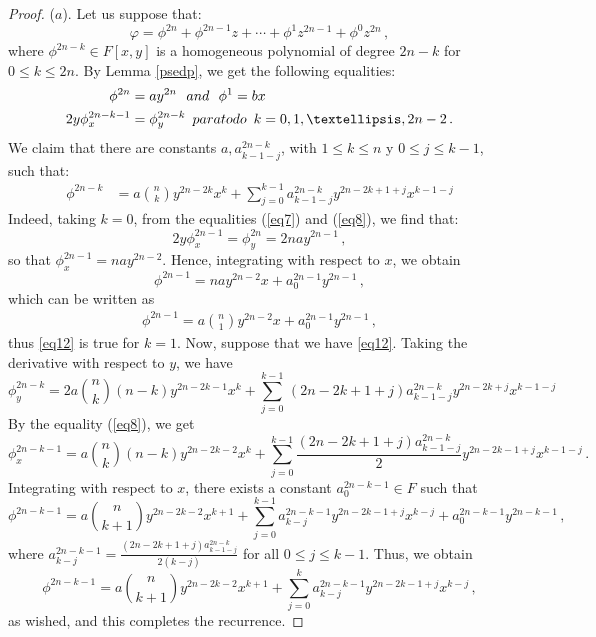 \documentclass{amsart}
\begin{document}
\begin{proof}
	($a$). Let us suppose that:
	\begin{equation}\label{eqh}
		\varphi=\phi^{2n}+\phi^{2n-1}z+\cdots+\phi^{1}z^{2n-1}+\phi^0z^{2n}\,,
	\end{equation}
	where $\phi^{2n-k}\in F[x,y]$ is a homogeneous polynomial of degree $2n-k$ for  $0\leq k\leq 2n$. By Lemma \ref{psedp}, we get the following equalities: 
	\begin{align}	
		\phi^{2n}&=ay^{2n}\label{eq7}\,\,\,\, \textnormal{and}\,\,\,\, \phi^{1}=bx\\
		2y\phi^{2n-k-1}_x&=\phi^{2n-k}_y\,\,\, \textnormal{para todo}\,\,\, k=0,1,\dots, 2n-2\,.\label{eq8}
	\end{align}
	We claim that there are constants $a, a^{2n-k}_{k-1-j}$, with  $1\leq k\leq n$ y $0\leq j\leq k-1$, such that:
	\begin{align}
		\phi^{2n-k}&=a\binom{n}{k}y^{2n-2k}x^k+\sum_{j=0}^{k-1} a^{2n-k}_{k-1-j}y^{2n-2k+1+j}x^{k-1-j}\label{eq12}
	\end{align}
	Indeed, taking $k=0$, from the equalities (\ref{eq7}) and  (\ref{eq8}), we find that:
	\begin{equation*}
		2y\phi^{2n-1}_x=\phi^{2n}_y=2nay^{2n-1}\,,
	\end{equation*}
	so that $\phi_x^{2n-1}=nay^{2n-2}$. Hence, integrating with respect to $x$, we obtain
	$$\phi^{2n-1}=nay^{2n-2}x+a^{2n-1}_0y^{2n-1}\,,$$ which can be written as 
	\begin{align*}
		\phi^{2n-1}=a\binom{n}{1}y^{2n-2}x+a^{2n-1}_{0}y^{2n-1}\,,
	\end{align*}
	thus \eqref{eq12} is true for $k=1$. Now, suppose that we have \eqref{eq12}. 
	Taking the derivative with respect to $y$, we have
	$$\phi^{2n-k}_y=2a\binom{n}{k}(n-k)y^{2n-2k-1}x^k+\sum_{j=0}^{k-1}\, (2n-2k+1+j)a^{2n-k}_{k-1-j}y^{2n-2k+j}x^{k-1-j}$$
	By the equality (\ref{eq8}), we get 
	$$\phi^{2n-k-1}_x=a\binom{n}{k}(n-k)y^{2n-2k-2}x^k+\sum_{j=0}^{k-1} \frac{(2n-2k+1+j)a^{2n-k}_{k-1-j}}{2}y^{2n-2k-1+j}x^{k-1-j}\,.$$
	Integrating with respect to $x$, there exists a constant $a^{2n-k-1}_{0}\in F$ such that
	$$\phi^{2n-k-1}=a\binom{n}{k+1}y^{2n-2k-2}x^{k+1}+\sum_{j=0}^{k-1} a^{2n-k-1}_{k-j}y^{2n-2k-1+j}x^{k-j}+a^{2n-k-1}_{0}y^{2n-k-1}\,,$$
	where $\displaystyle a^{2n-k-1}_{k-j}= \frac{(2n-2k+1+j)a^{2n-k}_{k-1-j}}{2(k-j)}$ for all $0\leq j\leq k-1$. Thus, we obtain
	$$\phi^{2n-k-1}=a\binom{n}{k+1}y^{2n-2k-2}x^{k+1}+\sum_{j=0}^{k}a^{2n-k-1}_{k-j}y^{2n-2k-1+j}x^{k-j}\,,$$
	as wished, and this completes the recurrence.
	

\end{proof}
\end{document}
